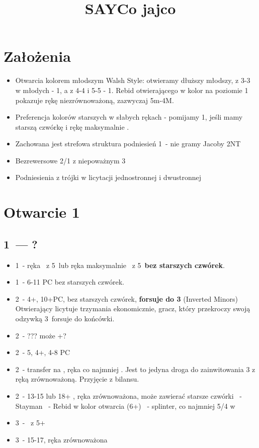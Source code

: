 \documentclass[12pt, a4paper]{article}
\title{\vspace{-2cm}SAYCo jajco}
\author{}
\date{}
\begin{document}
\maketitle
\section{Założenia}
\begin{itemize}
    \item Otwarcia kolorem młodszym Walsh Style: otwieramy dłuższy młodszy, z 3-3 w młodych - 1\clubs, a z 4-4 i
    5-5 - 1\diams. Rebid otwierającego w kolor na poziomie 1 pokazuje rękę niezrównoważoną, zazwyczaj 5m-4M.
    \item Preferencja kolorów starszych w słabych rękach - pomijamy 1\diams, jeśli mamy starszą czwórkę i rękę maksymalnie \inv.
    \item Zachowana jest strefowa struktura podniesień 1\major\ - nie gramy Jacoby 2NT
    \item Bezrewersowe 2/1 z niepoważnym 3\nt
    \item Podniesienia z trójki w licytacji jednostronnej i dwustronnej
\end{itemize}

\pagebreak

\section{Otwarcie 1\minor}
\subsection{1\clubs\ --- ?}
\begin{itemize}
    \item 1\diams\ - ręka \gf\ z 5\diams\ lub ręka maksymalnie \inv\ z 5\diams\ \textbf{bez starszych czwórek}.
    \item 1\nt\ - 6-11 PC bez starszych czwórek.
    \item 2\clubs\ - 4+\clubs, 10+PC, bez starszych czwórek, \textbf{forsuje do 3\clubs} (Inverted Minors)
        Otwierający licytuje trzymania ekonomicznie,
        gracz, który przekroczy swoją odzywką 3\clubs\ forsuje do końcówki.
    \item 2\diams\ - ??? może \diams+\major?
    \item 2\hearts\ - 5\spades, 4+\hearts, 4-8 PC
    \item 2\spades\ - transfer na \nt, ręka co najmniej \inv. Jest to jedyna droga do zainwitowania 3\nt
        z ręką zrównoważoną. Przyjęcie z bilansu.
    \item 2\nt\ - 13-15 lub 18+ \gf, ręka zrównoważona, może zawierać starsze czwórki
    \clubs\ - Stayman
    \diams\ - Rebid w kolor otwarcia (6+\minor)
    \major\ - splinter, co najmniej 5/4 w \minor
    \item 3\clubs\ - \mixed\ z 5+\clubs\
    \item 3\nt\ - 15-17, ręka zrównoważona
\end{itemize}
\end{document}
